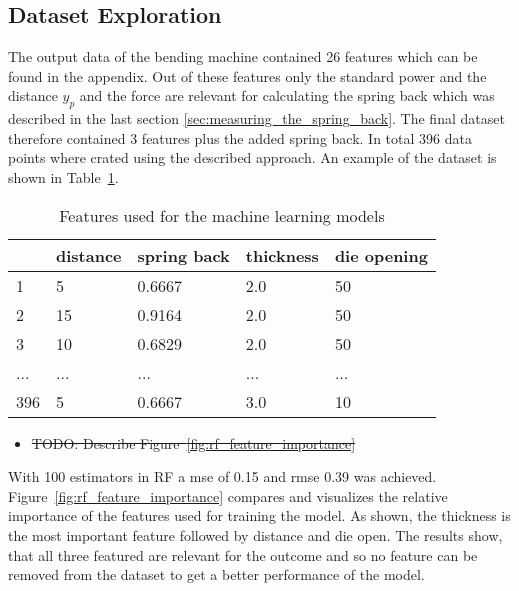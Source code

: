 \subsection{Dataset Exploration}
The output data of the bending machine contained 26 features which can be found in the appendix. Out of these features only the standard power and the distance $y_p$ and the force are relevant for calculating the spring back which was described in the last section \ref{sec:measuring_the_spring_back}.
The final dataset therefore contained 3 features plus the added spring back.
In total 396 data points where crated using the described approach.
An example of the dataset is shown in Table~\ref{tab:dataset_example}.

\begin{table}[H]
    \centering
    \begin{tabular}{|l|l|l|l|l|}
        \hline
        \textbf{} & \textbf{distance} & \textbf{spring back} & \textbf{thickness} & \textbf{die opening} \\ \hline
        1         & 5                 & 0.6667               & 2.0                & 50                   \\
        2         & 15                & 0.9164               & 2.0                & 50                   \\
        3         & 10                & 0.6829               & 2.0                & 50                   \\
        ...       & ...               & ...                  & ...                & ...                  \\
        396       & 5                 & 0.6667               & 3.0                & 10                   \\
        \hline
    \end{tabular}
    \caption{Features used for the machine learning models}
    \label{tab:dataset_example}
\end{table}

\begin{itemize}
    \item \sout{TODO: Describe Figure~\ref{fig:rf_feature_importance}}
\end{itemize}

With 100 estimators in \ac{RF} a \ac{mse} of 0.15 and \ac{rmse} 0.39 was achieved.
Figure~\ref{fig:rf_feature_importance} compares and visualizes the relative importance of the features used for training the model.
As shown, the thickness is the most important feature followed by distance and die open. The results show, that all three featured are relevant for the outcome and so no feature can be removed from the dataset to get a better performance of the model.


